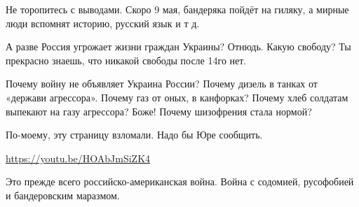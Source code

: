 \begin{itemize}
Не торопитесь с выводами. Скоро 9 мая, бандеряка пойдёт на гиляку, а мирные люди вспомнят историю, русский язык и т д.

А разве Россия угрожает жизни граждан Украины? Отнюдь. Какую свободу? Ты прекрасно знаешь, что никакой свободы после 14го нет.


Почему войну не объявляет Украина России? Почему дизель в танках от «держави
агрессора». Почему газ от оных, в канфорках? Почему хлеб солдатам выпекают на
газу агрессора? Боже! Почему шизофрения стала нормой?


По-моему, эту страницу взломали. Надо бы Юре сообщить.

\url{https://youtu.be/HOAbJmSiZK4}

Это прежде всего российско-американская война. Война с содомией, русофобией и бандеровским маразмом.



\end{itemize} %
